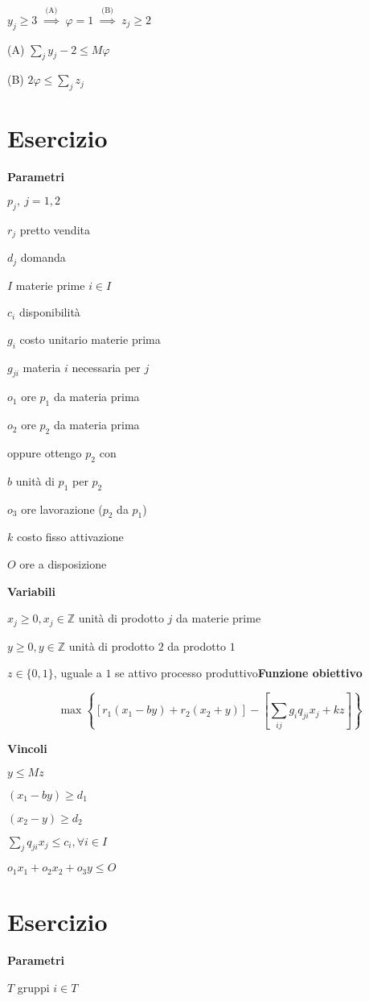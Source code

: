 \documentclass[10pt,a4paper,twoside,openright]{book}
\newcounter{es}
\newcommand{\Es}{
	\stepcounter{es}
	\section{Esercizio \arabic{es}}
	}
\newcommand{\Par}{\textbf{Parametri}}
\newcommand{\Var}{\textbf{Variabili}}
\newcommand{\Fob}{\textbf{Funzione obiettivo}}
\newcommand{\Vin}{\textbf{Vincoli}}
\begin{document}
$y_{j} \geqslant 3\ \ \overset{\text{(A)}}{\Rightarrow } \ \ \varphi =1\ \ \overset{\text{(B)}}{\Rightarrow } \ \ z_{j} \geqslant 2$

(A) $\sum _{j} y_{j} -2\leq M\varphi $

(B) $2\varphi \leq \sum _{j} z_{j}$

\Es

\Par

$p_{j} ,\ j=1,2$

$r_{j}$ pretto vendita

$d_{j}$ domanda

$I$ materie prime $i\in I$

$c_{i}$ disponibilità

$g_{i}$ costo unitario materie prima

$g_{ji}$ materia $i$ necessaria per $j$

$o_{1}$ ore $p_{1}$ da materia prima

$o_{2}$ ore $p_{2}$ da materia prima

oppure ottengo $p_{2}$ con

$b$ unità di $p_{1}$ per $p_{2}$

$o_{3}$ ore lavorazione ($p_{2}$ da $p_{1}$)

$k$ costo fisso attivazione

$O$ ore a disposizione

\Var

$x_{j} \geqslant 0,x_{j} \in \mathbb{Z}$ unità di prodotto $j$ da materie prime

$y\geq 0,y\in \mathbb{Z}$ unità di prodotto $2$ da prodotto $1$

$z\in \{0,1\}$, uguale a $1$ se attivo processo produttivo\Fob

\begin{equation*}
	\max\left\{[ r_{1}( x_{1} -by) +r_{2}( x_{2} +y)] -\left[\sum _{ij} g_{i} q_{ji} x_{j} +kz\right]\right\}
\end{equation*}

\Vin

$y\leq Mz$

$( x_{1} -by) \geqslant d_{1}$

$( x_{2} -y) \geqslant d_{2}$

$\sum _{j} q_{ji} x_{j} \leq c_{i} ,\forall i\in I$

$o_{1} x_{1} +o_{2} x_{2} +o_{3} y\leq O$

\Es

\Par

$T$ gruppi $i\in T$
\end{document}
